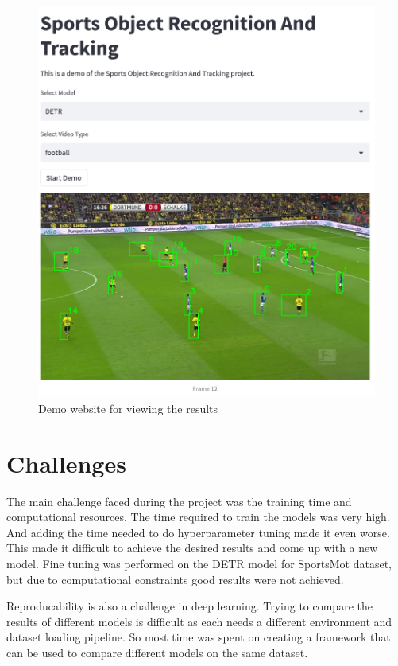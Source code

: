 \documentclass[runningheads]{llncs}
\begin{document}
\begin{figure}
    \centering
    \includegraphics[width=\textwidth,height=13cm,keepaspectratio]{images/sport_demo.png}
    \caption{Demo website for viewing the results}
    \label{fig:sport_demo}
\end{figure}


\section{Challenges}

The main challenge faced during the project was the training time and computational resources.
The time required to train the models was very high.
And adding the time needed to do hyperparameter tuning made it even worse.
This made it difficult to achieve the desired results and come up with a new model.
Fine tuning was performed  on the DETR model for SportsMot dataset, but due to computational constraints good results were not achieved.

Reproducability is also a challenge in deep learning.
Trying to compare the results of different models is difficult as each needs a different environment and dataset loading pipeline.
So most time was spent on creating a framework that can be used to compare different models on the same dataset.
\end{document}
